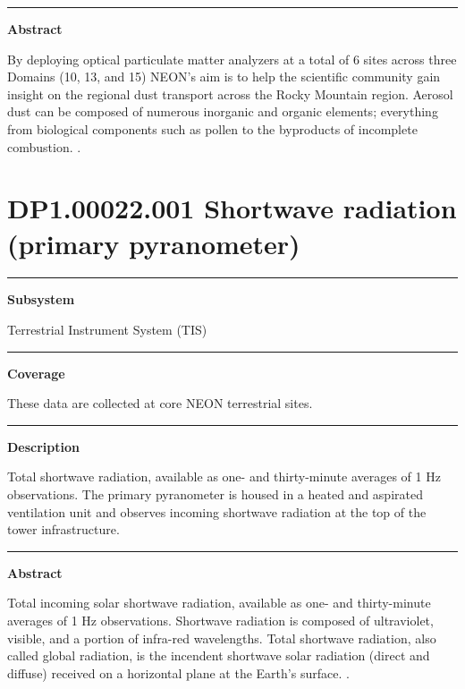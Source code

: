 \documentclass[]{article}
\begin{document}
\begin{center}\rule{0.5\linewidth}{\linethickness}\end{center}

\textbf{Abstract}

By deploying optical particulate matter analyzers at a total of 6 sites
across three Domains (10, 13, and 15) NEON's aim is to help the
scientific community gain insight on the regional dust transport across
the Rocky Mountain region. Aerosol dust can be composed of numerous
inorganic and organic elements; everything from biological components
such as pollen to the byproducts of incomplete combustion. \newpage
.

\section{DP1.00022.001 Shortwave radiation (primary
pyranometer)}\label{dp1.00022.001-shortwave-radiation-primary-pyranometer}

\begin{center}\rule{0.5\linewidth}{\linethickness}\end{center}

\textbf{Subsystem}

Terrestrial Instrument System (TIS)

\begin{center}\rule{0.5\linewidth}{\linethickness}\end{center}

\textbf{Coverage}

These data are collected at core NEON terrestrial sites.

\begin{center}\rule{0.5\linewidth}{\linethickness}\end{center}

\textbf{Description}

Total shortwave radiation, available as one- and thirty-minute averages
of 1 Hz observations. The primary pyranometer is housed in a heated and
aspirated ventilation unit and observes incoming shortwave radiation at
the top of the tower infrastructure.

\begin{center}\rule{0.5\linewidth}{\linethickness}\end{center}

\textbf{Abstract}

Total incoming solar shortwave radiation, available as one- and
thirty-minute averages of 1 Hz observations. Shortwave radiation is
composed of ultraviolet, visible, and a portion of infra-red
wavelengths. Total shortwave radiation, also called global radiation, is
the incendent shortwave solar radiation (direct and diffuse) received on
a horizontal plane at the Earth's surface. \newpage
.
\end{document}
